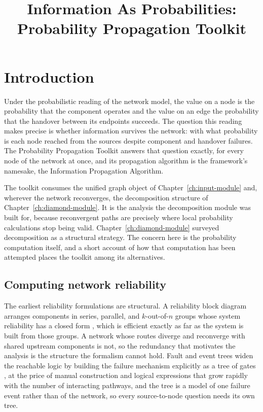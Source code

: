 \documentclass[12pt]{report}
\begin{document}
\title{Information As Probabilities: Probability Propagation Toolkit}
\fi

\providecommand{\Pa}{\mathrm{Pa}}
\providecommand{\anc}{\mathrm{anc}}
\providecommand{\infl}{\mathrm{infl}}



\section{Introduction}
\label{sec:pp-intro}

Under the probabilistic reading of the network model, the value on a node is the probability that the component operates and the value on an edge the probability that the handover between its endpoints succeeds. The question this reading makes precise is whether information survives the network: with what probability is each node reached from the sources despite component and handover failures. The Probability Propagation Toolkit answers that question exactly, for every node of the network at once, and its propagation algorithm is the framework's namesake, the Information Propagation Algorithm.

The toolkit consumes the unified graph object of Chapter~\ref{ch:input-module} and, wherever the network reconverges, the decomposition structure of Chapter~\ref{ch:diamond-module}. It is the analysis the decomposition module was built for, because reconvergent paths are precisely where local probability calculations stop being valid. Chapter~\ref{ch:diamond-module} surveyed decomposition as a structural strategy. The concern here is the probability computation itself, and a short account of how that computation has been attempted places the toolkit among its alternatives.

\subsection{Computing network reliability}
\label{sec:pp-survey}

The earliest reliability formulations are structural. A reliability block diagram arranges components in series, parallel, and $k$-out-of-$n$ groups whose system reliability has a closed form \cite{billinton1992network}, which is efficient exactly as far as the system is built from those groups. A network whose routes diverge and reconverge with shared upstream components is not, so the redundancy that motivates the analysis is the structure the formalism cannot hold. Fault and event trees widen the reachable logic by building the failure mechanism explicitly as a tree of gates \cite{xing2008fault}, at the price of manual construction and logical expressions that grow rapidly with the number of interacting pathways, and the tree is a model of one failure event rather than of the network, so every source-to-node question needs its own tree.
\end{document}

